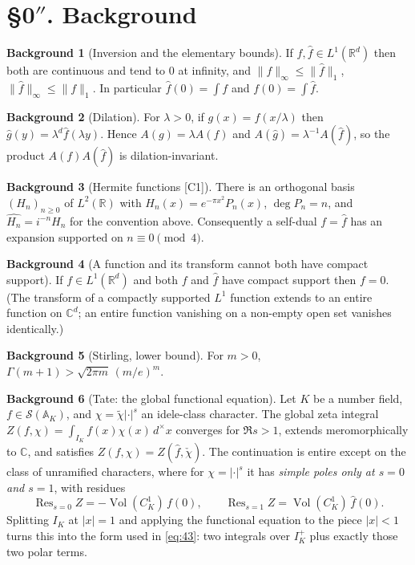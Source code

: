 \documentclass[11pt,reqno]{amsart}
\theoremstyle{plain}
\theoremstyle{definition}
\newtheorem*{bg}{Background}
\theoremstyle{remark}
\newcommand{\R}{\mathbb{R}}
\newcommand{\C}{\mathbb{C}}
\newcommand{\Ss}{\mathcal{S}}
\newcommand{\fh}{\widehat{f}}
\DeclareMathOperator{\Res}{Res}
\newcommand{\Ledger}[1]{{\scriptsize\textsf{[#1]}}}
\begin{document}
\section*{\S0$''$. Background}

\begin{bg}[Inversion and the elementary bounds]\label{bg:inv}
If $f,\fh\in L^1(\R^d)$ then both are continuous and tend to $0$ at infinity, and
$\|f\|_\infty\le\|\fh\|_1$, $\|\fh\|_\infty\le\|f\|_1$. In particular
$\fh(0)=\int f$ and $f(0)=\int\fh$.
\end{bg}

\begin{bg}[Dilation]\label{bg:dil}
For $\lambda>0$, if $g(x)=f(x/\lambda)$ then $\widehat g(y)=\lambda^d\fh(\lambda y)$.
Hence $A(g)=\lambda A(f)$ and $A(\widehat g)=\lambda^{-1}A(\fh)$, so the product
$A(f)A(\fh)$ is dilation-invariant.
\end{bg}

\begin{bg}[Hermite functions \Ledger{C1}]\label{bg:herm}
There is an orthogonal basis $(H_n)_{n\ge0}$ of $L^2(\R)$ with
$H_n(x)=e^{-\pi x^2}P_n(x)$, $\deg P_n=n$, and $\widehat{H_n}=i^{-n}H_n$ for the
convention above. Consequently a self-dual $f=\fh$ has an expansion supported on
$n\equiv0\pmod4$.
\end{bg}

\begin{bg}[A function and its transform cannot both have compact support]\label{bg:cpt}
If $f\in L^1(\R^d)$ and both $f$ and $\fh$ have compact support then $f=0$. (The
transform of a compactly supported $L^1$ function extends to an entire function on
$\C^d$; an entire function vanishing on a non-empty open set vanishes identically.)
\end{bg}

\begin{bg}[Stirling, lower bound]\label{bg:stir}
For $m>0$, $\Gamma(m+1)>\sqrt{2\pi m}\,(m/e)^m$.
\end{bg}

\begin{bg}[Tate: the global functional equation]\label{bg:tate}
Let $K$ be a number field, $f\in\Ss(\mathbb A_K)$, and $\chi=\tilde\chi|\cdot|^s$ an
idele-class character. The global zeta integral
$Z(f,\chi)=\int_{I_K}f(x)\chi(x)\,d^\times x$ converges for $\Re s>1$, extends
meromorphically to $\C$, and satisfies $Z(f,\chi)=Z(\fh,\check\chi)$. The continuation
is entire except on the class of unramified characters, where for
$\chi=|\cdot|^{s}$ it has \emph{simple poles only at $s=0$ and $s=1$}, with residues
\[\Res_{s=0}Z=-\operatorname{Vol}(C_K^1)\,f(0),\qquad
  \Res_{s=1}Z=\operatorname{Vol}(C_K^1)\,\fh(0).\]
Splitting $I_K$ at $|x|=1$ and applying the functional equation to the piece $|x|<1$
turns this into the form used in \eqref{eq:43}: two integrals over $I_K^+$ plus exactly
those two polar terms.
\end{bg}
\end{document}
